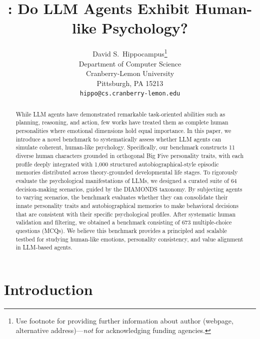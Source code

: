 \documentclass{article}
\title{\heartbenchicon \ourbench: Do LLM Agents Exhibit Human-like Psychology?}
\author{%
  David S.~Hippocampus\thanks{Use footnote for providing further information
    about author (webpage, alternative address)---\emph{not} for acknowledging
    funding agencies.} \\
  Department of Computer Science\\
  Cranberry-Lemon University\\
  Pittsburgh, PA 15213 \\
  \texttt{hippo@cs.cranberry-lemon.edu} \\
}
\begin{document}
\maketitle

\begin{abstract}
While LLM agents have demonstrated remarkable task-oriented abilities such as planning, reasoning, and action, few works have treated them as complete human personalities where emotional dimensions hold equal importance. In this paper, we introduce a novel benchmark to systematically assess whether LLM agents can simulate coherent, human-like psychology. Specifically, our benchmark constructs 11 diverse human characters grounded in orthogonal Big Five personality traits, with each profile deeply integrated with 1,000 structured autobiographical-style episodic memories distributed across theory-grounded developmental life stages. To rigorously evaluate the psychological manifestations of LLMs, we designed a curated suite of 64 decision-making scenarios, guided by the DIAMONDS taxonomy. By subjecting agents to varying scenarios, the benchmark evaluates whether they can consolidate their innate personality traits and autobiographical memories to make behavioral decisions that are consistent with their specific psychological profiles. After systematic human validation and filtering, we obtained a benchmark consisting of 673 multiple-choice questions (MCQs). We believe this benchmark provides a principled and scalable testbed for studying human-like emotions, personality consistency, and value alignment in LLM-based agents.

\end{abstract}

\section{Introduction}
\label{sec:Introduction}
\end{document}
